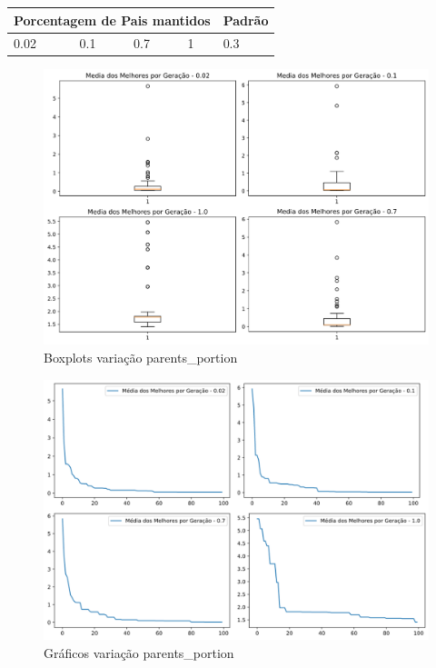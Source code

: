 \documentclass[12pt]{article}
\begin{document}
\begin{table}[H]
	\centering
	\begin{tabular}{|l|l|l|l|l|}
		\hline
		\multicolumn{4}{|l|}{Porcentagem de Pais mantidos} & Padrão \\ \hline
		0.02    & 0.1    & 0.7    & 1   &0.3 \\ \hline
	\end{tabular}
\end{table}

\begin{figure}[H]
	\centering
	\includegraphics[width=0.9\linewidth]{Imagens/parentsPortion/boxplotParPor}
	\caption{Boxplots variação parents\_portion}
	\label{fig:boxplotparpor}
\end{figure}
\begin{figure}[H]
	\centering
	\includegraphics[width=0.9\linewidth]{Imagens/parentsPortion/graficoParPor}
	\caption{Gráficos variação parents\_portion}
	\label{fig:graficoparpor}
\end{figure}
\end{document}
